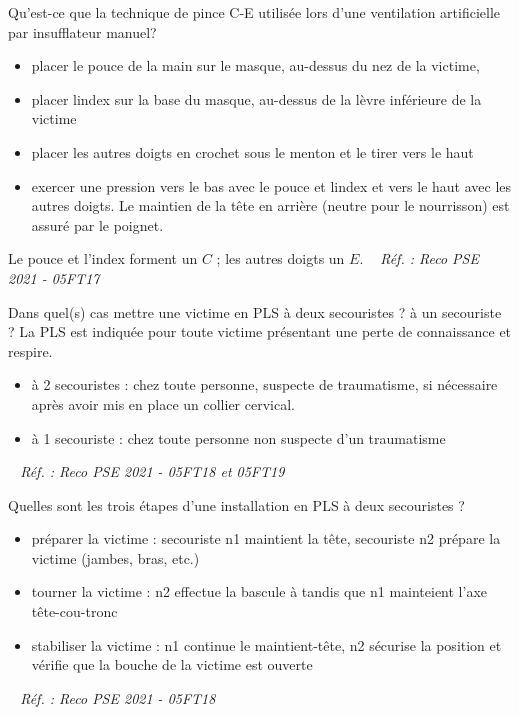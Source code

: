 \documentclass[grid,avery5371,landscape]{flashcards}
\makeatletter
\newcounter{nocarte}
\newcommand{\categ}[1]{%
  \def\@categ{#1}%
  \setcounter{nocarte}{0}%
}
\newcommand{\source}[1]{%
  \medskip
  \itshape%
   ~ \hfill Réf. : #1}
\makeatother
\begin{document}
\color[HTML]{003273}
\categ{PSE}
\begin{flashcard}[geste]{
 Qu'est-ce que la technique de pince C-E utilisée lors d'une ventilation artificielle par insufflateur manuel?   }
  \begin{itemize}
\item placer le pouce de la main sur le masque, au-dessus du nez de la victime,
\item placer lindex sur la base du masque, au-dessus de la lèvre inférieure de la victime 
\item placer les autres doigts en crochet sous le menton et le tirer vers le haut
\item exercer une pression vers le bas avec le pouce et lindex et vers le haut avec les autres doigts.
Le maintien de la tête en arrière (neutre pour le nourrisson) est assuré par le poignet.
\end{itemize}
Le pouce et l'index forment un $C$ ; les autres doigts un $E$.
  \source{Reco PSE 2021 - 05FT17}
\end{flashcard}


\color[HTML]{003273}
\categ{PSE}
\begin{flashcard}[CAT]{
 Dans quel(s) cas mettre une victime en PLS à deux secouristes ? à un secouriste ?   }
  La PLS est indiquée pour toute victime présentant une perte de connaissance et respire. 
\begin{itemize}
\item à 2 secouristes : chez toute personne, suspecte de traumatisme, si nécessaire après avoir mis en place un collier cervical.
\item à 1 secouriste : chez toute personne non suspecte d'un traumatisme
\end{itemize}
  \source{Reco PSE 2021 - 05FT18 et 05FT19}
\end{flashcard}


\color[HTML]{003273}
\categ{PSE}
\begin{flashcard}[geste]{
 Quelles sont les trois étapes d'une installation en PLS à deux secouristes ?   }
  \begin{itemize}
\item préparer la victime : secouriste n1 maintient la tête, secouriste n2 prépare la victime (jambes, bras, etc.) 
\item tourner la victime : n2 effectue la bascule à tandis que n1 mainteient l'axe tête-cou-tronc
\item stabiliser la victime : n1 continue le maintient-tête, n2 sécurise la position et vérifie que la bouche de la victime est ouverte
\end{itemize}
  \source{Reco PSE 2021 - 05FT18}
\end{flashcard}
\end{document}
